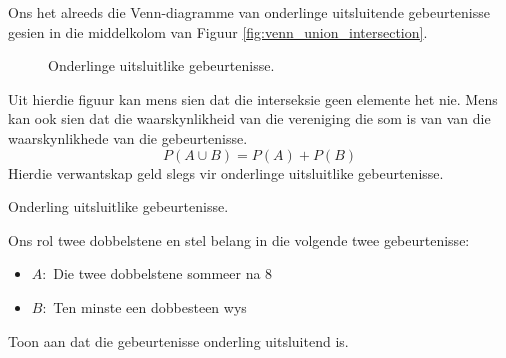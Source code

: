 Ons het alreeds die Venn-diagramme van onderlinge uitsluitende gebeurtenisse gesien in die middelkolom van Figuur \ref{fig:venn_union_intersection}.

\begin{figure}[h]
  
  \caption{Onderlinge uitsluitlike gebeurtenisse.}
\end{figure}

Uit hierdie figuur kan mens sien dat die interseksie geen elemente het nie. Mens kan ook sien dat die waarskynlikheid van die vereniging die som is van van die waarskynlikhede van die gebeurtenisse.
\[P(A \cup B) = P(A) + P(B)\]
Hierdie verwantskap geld slegs vir onderlinge uitsluitlike gebeurtenisse.

\begin{wex}{Onderling uitsluitlike gebeurtenisse.}{
  Ons rol twee dobbelstene en stel belang in die volgende twee gebeurtenisse:
  \begin{itemize}
  \item[] $A:$ Die twee dobbelstene sommeer na $8$
  \item[] $B:$ Ten minste een dobbesteen wys 
  \end{itemize}
  Toon aan dat die gebeurtenisse onderling uitsluitend is.
}{

}
\end{wex}
